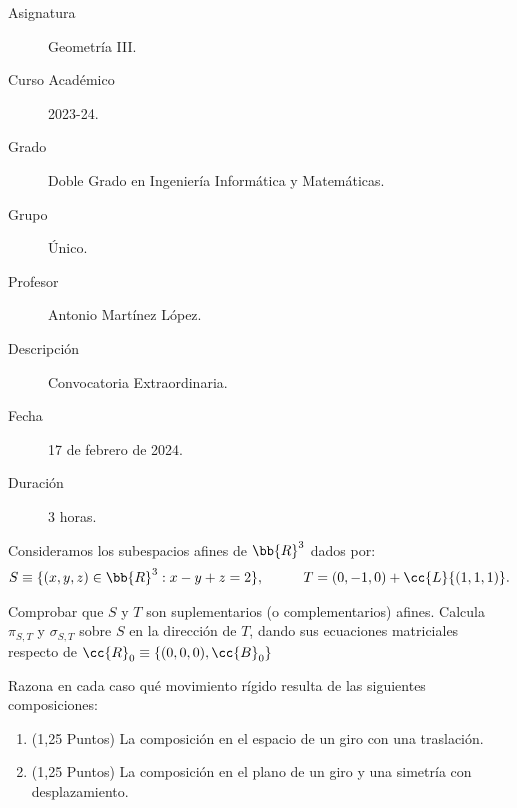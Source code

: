 \documentclass[12pt]{article}
\begin{document}

    
    

    
    \begin{description}
        \item[Asignatura] Geometría III.
        \item[Curso Académico] 2023-24.
        \item[Grado] Doble Grado en Ingeniería Informática y Matemáticas.
        \item[Grupo] Único.
        \item[Profesor] Antonio Martínez López.
        \item[Descripción] Convocatoria Extraordinaria.
        \item[Fecha] 17 de febrero de 2024.
        \item[Duración] 3 horas.
    
    \end{description}
    \newpage

    \begin{ejercicio}[2,5 puntos]
        Consideramos los subespacios afines de $\bb{R}^3$ dados por:
        \begin{gather*}
            S \equiv \{(x,y,z) \in \bb{R}^3 : x-y+z=2\}, \hspace*{1cm} T=(0,-1,0)+\cc{L}\{(1,1,1)\}.
        \end{gather*}

        Comprobar que $S$ y $T$ son suplementarios (o complementarios) afines. Calcula $\pi_{S,T}$ y $\sigma_{S,T}$ sobre $S$ en la dirección de $T$, dando sus ecuaciones matriciales respecto de $\cc{R}_0\equiv\{(0,0,0), \cc{B}_0\}$
    \end{ejercicio}

    \begin{ejercicio}[2,5 puntos]
        Razona en cada caso qué movimiento rígido resulta de las siguientes composiciones:

        \begin{enumerate}
            \item (1,25 Puntos) La composición en el espacio de un giro con una traslación.
            \item (1,25 Puntos) La composición en el plano de un giro y una simetría con desplazamiento.
        \end{enumerate}

    \end{ejercicio}
\end{document}
